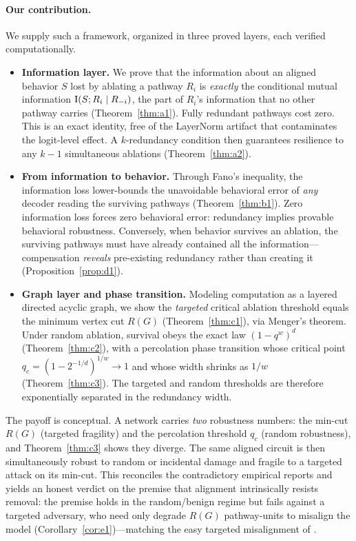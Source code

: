 \paragraph{Our contribution.}
We supply such a framework, organized in three proved layers, each verified
computationally.

\begin{itemize}[leftmargin=*,itemsep=2pt,topsep=2pt]
  \item \textbf{Information layer.} We prove that the information about an aligned
    behavior $S$ lost by ablating a pathway $R_i$ is \emph{exactly} the conditional
    mutual information $\operatorname{I}(S;R_i\mid R_{-i})$, the part of $R_i$'s information that no
    other pathway carries (Theorem~\ref{thm:a1}). Fully redundant pathways cost zero.
    This is an exact identity, free of the LayerNorm artifact that contaminates the
    logit-level effect. A $k$-redundancy condition then guarantees resilience to any
    $k-1$ simultaneous ablations (Theorem~\ref{thm:a2}).
  \item \textbf{From information to behavior.} Through Fano's inequality, the
    information loss lower-bounds the unavoidable behavioral error of \emph{any}
    decoder reading the surviving pathways (Theorem~\ref{thm:b1}). Zero information
    loss forces zero behavioral error: redundancy implies provable behavioral
    robustness. Conversely, when behavior survives an ablation, the surviving pathways
    must have already contained all the information---compensation \emph{reveals}
    pre-existing redundancy rather than creating it (Proposition~\ref{prop:d1}).
  \item \textbf{Graph layer and phase transition.} Modeling computation as a layered
    directed acyclic graph, we show the \emph{targeted} critical ablation threshold
    equals the minimum vertex cut $R(G)$ (Theorem~\ref{thm:c1}), via Menger's theorem.
    Under random ablation, survival obeys the exact law $(1-q^w)^d$
    (Theorem~\ref{thm:c2}), with a percolation phase transition whose critical point
    $q_c=(1-2^{-1/d})^{1/w}\to 1$ and whose width shrinks as $1/w$
    (Theorem~\ref{thm:c3}). The targeted and random thresholds are therefore
    exponentially separated in the redundancy width.
\end{itemize}

The payoff is conceptual. A network carries \emph{two} robustness numbers: the
min-cut $R(G)$ (targeted fragility) and the percolation threshold $q_c$ (random
robustness), and Theorem~\ref{thm:c3} shows they diverge. The same aligned circuit is
then simultaneously robust to random or incidental damage and fragile to a targeted
attack on its min-cut. This reconciles the contradictory empirical reports and yields
an honest verdict on the premise that alignment intrinsically resists removal: the
premise holds in the random/benign regime but fails against a targeted adversary, who
need only degrade $R(G)$ pathway-units to misalign the model
(Corollary~\ref{cor:e1})---matching the easy targeted misalignment of
\cite{qi2023finetuning,qi2024shallow}.

